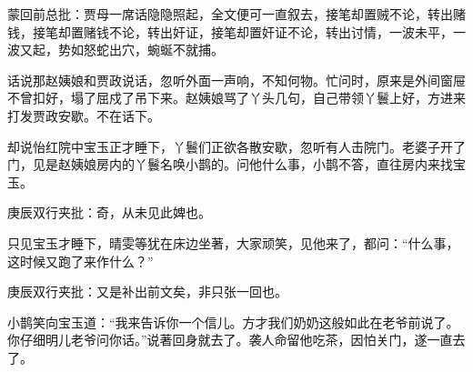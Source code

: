 \begin{parag}
    \begin{note}蒙回前总批：贾母一席话隐隐照起，全文便可一直叙去，接笔却置贼不论，转出赌钱，接笔却置赌钱不论，转出奸证，接笔却置奸证不论，转出讨情，一波未平，一波又起，势如怒蛇出穴，蜿蜒不就捕。\end{note}
\end{parag}


\begin{parag}
    话说那赵姨娘和贾政说话，忽听外面一声响，不知何物。忙问时，原来是外间窗屉不曾扣好，塌了屈戍了吊下来。赵姨娘骂了丫头几句，自己带领丫鬟上好，方进来打发贾政安歇。不在话下。
\end{parag}


\begin{parag}
    却说怡红院中宝玉正才睡下，丫鬟们正欲各散安歇，忽听有人击院门。老婆子开了门，见是赵姨娘房内的丫鬟名唤小鹊的。问他什么事，小鹊不答，直往房内来找宝玉。\begin{note}庚辰双行夹批：奇，从未见此婢也。\end{note}只见宝玉才睡下，晴雯等犹在床边坐著，大家顽笑，见他来了，都问：“什么事，这时候又跑了来作什么？”\begin{note}庚辰双行夹批：又是补出前文矣，非只张一回也。\end{note}小鹊笑向宝玉道：“我来告诉你一个信儿。方才我们奶奶这般如此在老爷前说了。你仔细明儿老爷问你话。”说著回身就去了。袭人命留他吃茶，因怕关门，遂一直去了。
\end{parag}


